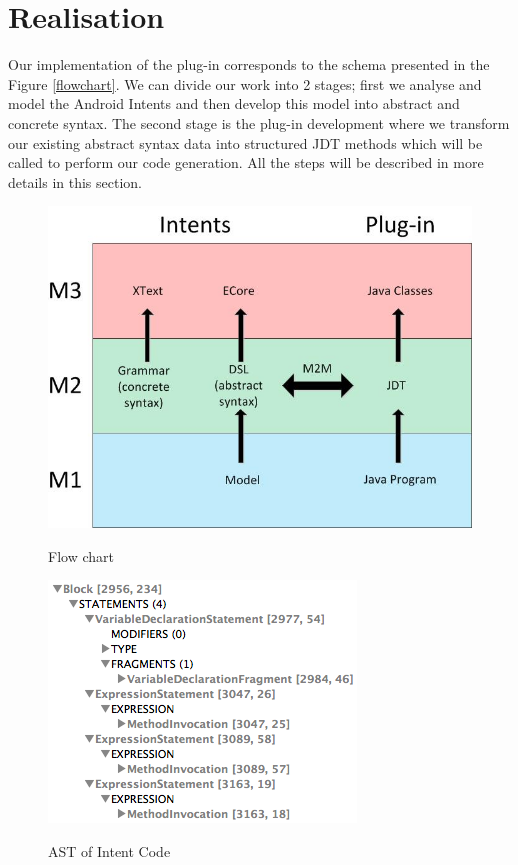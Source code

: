 \section{Realisation}
\label{realisation}

Our implementation of the plug-in corresponds to the schema presented in the Figure \ref{flowchart}. We can divide our work into 2 stages; first we analyse and model the Android Intents and then develop this model into abstract and concrete syntax. The second stage is the plug-in development where we transform our existing abstract syntax data into structured JDT methods which will be called to perform our code generation. All the steps will be described in more details in this section.  

\begin{figure}[t]
\begin{minipage}{0.5\textwidth}
\label{flowchart}
  \centering
    \includegraphics[width=.95\textwidth]{flowchart}
  \caption{Flow chart}
\end{minipage}%
\begin{minipage}{0.5\textwidth}
\label{asttreeview}
  \centering
    \includegraphics[width=.95\textwidth]{ast}
  \caption{AST of Intent Code}
\end{minipage}%
\end{figure}

